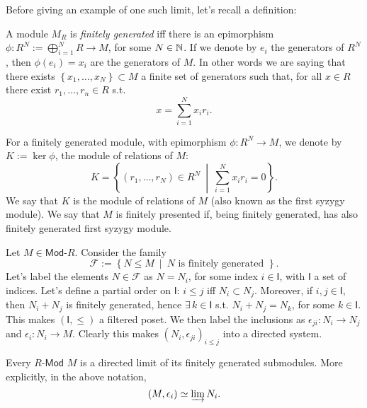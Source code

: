 Before giving an example of one such limit, let's recall a definition:
\begin{defn}
	A module $M_R$ is {\em finitely generated} iff there is an epimorphism
	$\phi: R^N := \bigoplus_{i=1}^N R \to M$, for some $N \in \mathbb{N}$.
	If we denote by $e_i$ the generators of $R^N$, then $\phi(e_i) = x_i$ are the generators of $M$.
	In other words we are saying that there exists
	$\left\{ x_1, \ldots, x_N \right\} \subset M$ a finite set of generators 
	such that, for all $x \in R$ there exist $r_1, \ldots, r_n \in R$ s.t.
	\begin{equation}
	x = \sum_{i=1}^{N} x_i r_i
	.\end{equation} 
\end{defn}

\begin{defn}
	For a finitely generated module, with epimorphism $\phi: R^N \to M$,
	we denote by $K := \ker \phi$, the module of relations of $M$:
	\begin{equation}
	K = 
	\left\{ \left( r_1, \ldots, r_N \right) \in R^N \ \middle|\ \sum_{i=1}^{N} x_i r_i = 0 \right\}
	.\end{equation} 
	We say that $K$ is the module of relations of $M$ (also known as the first syzygy module).
	We say that $M$ is finitely presented if, being finitely generated, has also finitely generated first syzygy module.
\end{defn}

\begin{ex}
	Let $M \in \mathsf{Mod}\text{-}R$.
	Consider the family
	\begin{equation}
	\mathcal{F} := \left\{ N \leq M \ \middle|\ 
	N \text{ is finitely generated } \right\}
	.\end{equation} 
	Let's label the elements $N \in \mathcal{F}$ as $N= N_i$, for some index $i \in \mathsf{I}$, with $\mathsf{I}$ a set of indices.
	Let's define a partial order on $\mathsf{I}$:
	$i \leq j$ iff $N_i \subset N_j$.
	Moreover, if $i, j \in \mathsf{I}$, then $N_i + N_j$ is finitely generated, hence $\exists\, k \in \mathsf{I}$ s.t.
	$N_i + N_j = N_k$, for some $k \in \mathsf{I}$.
	This makes $\left( \mathsf{I}, \leq \right)$ a filtered poset.
	We then label the inclusions as $\epsilon_{ji}: N_i \to N_j$ and $\epsilon_i: N_i \to M$.
	Clearly this makes $\left(N_i, \epsilon_{ji}\right)_{i \leq j}$ into a directed system.
\end{ex} 

\begin{prop}
	Every $R\text{-}\mathsf{Mod}$ $M$ is a directed limit of its finitely generated submodules.
	More explicitly, in the above notation,
	\begin{equation}
	\left(M, \epsilon_i\right) \simeq \varinjlim N_i
	.\end{equation} 
\end{prop} 

